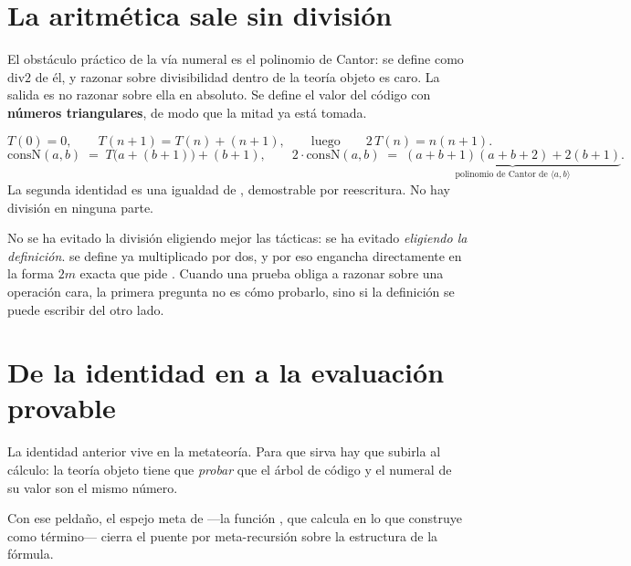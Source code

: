 \section{La aritmética sale sin división}

El obstáculo práctico de la vía numeral es el polinomio de Cantor:  se define como
$\mathrm{div2}$ de él, y razonar sobre divisibilidad dentro de la teoría objeto es caro. La salida
es no razonar sobre ella en absoluto. Se define el valor del código con \textbf{números
triangulares}, de modo que la mitad ya está tomada.

\begin{matematica}
\[
T(0)=0,\qquad T(n{+}1)=T(n)+(n{+}1),
\qquad\text{luego}\qquad 2\,T(n)=n(n{+}1).
\]
\[
\mathrm{consN}(a,b) \;=\; T\bigl(a+(b{+}1)\bigr) + (b{+}1),
\qquad
2\cdot\mathrm{consN}(a,b) \;=\; \underbrace{(a{+}b{+}1)(a{+}b{+}2) + 2(b{+}1)}_{\text{polinomio de Cantor de }\langle a,b\rangle}.
\]
La segunda identidad es una igualdad de , demostrable por reescritura. No hay división
en ninguna parte.
\end{matematica}


\begin{leccion}
No se ha evitado la división eligiendo mejor las tácticas: se ha evitado \emph{eligiendo la
definición}.  se define ya multiplicado por dos, y por eso engancha directamente en la
forma $2m$ exacta que pide . Cuando una prueba obliga a razonar sobre una
operación cara, la primera pregunta no es cómo probarlo, sino si la definición se puede escribir
del otro lado.
\end{leccion}

\section{De la identidad en  a la evaluación provable}

La identidad anterior vive en la metateoría. Para que sirva hay que subirla al cálculo: la teoría
objeto tiene que \emph{probar} que el árbol de código y el numeral de su valor son el mismo número.


Con ese peldaño, el espejo meta de  —la función , que calcula en
 lo que  construye como término— cierra el puente por meta-recursión sobre
la estructura de la fórmula.

